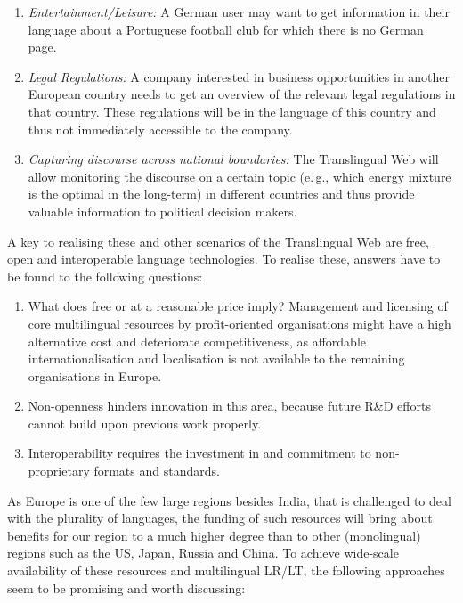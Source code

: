 \documentclass[10pt, plain]{../../metanetpaper}
\begin{document}
\begin{multicols}{2}
\begin{enumerate}
\item \emph{Entertainment/Leisure:} A German user may want to get information in their language about a Portuguese football club for which there is no German page.
\item \emph{Legal Regulations:} A company interested in business opportunities in another European country needs to get an overview of the relevant legal regulations in that country. These regulations will be in the language of this country and thus not immediately accessible to the company.
\item \emph{Capturing discourse across national boundaries:} The Translingual Web will allow monitoring the discourse on a certain topic (e.\,g., which energy mixture is the optimal in the long-term) in different countries and thus provide valuable information to political decision makers.
\end{enumerate}

A key to realising these and other scenarios of the Translingual Web are free, open and interoperable language technologies. To realise these, answers have to be found to the following questions:

\begin{enumerate}
\item What does free or at  a reasonable price imply? Management and licensing of core multilingual resources by profit-oriented organisations might have a high alternative cost and deteriorate competitiveness, as affordable internationalisation and localisation is not available to the remaining organisations in Europe.
\item Non-openness hinders innovation in this area, because future R\&D efforts cannot build upon previous work properly.
\item Interoperability requires the investment in and commitment to non-proprietary formats and standards.
\end{enumerate}

As Europe is one of the few large regions besides India, that is challenged to deal with the plurality of languages, the funding of such resources will bring about benefits for our region to a much higher degree than  to other (monolingual) regions such as the US, Japan, Russia and China.  To achieve wide-scale availability of these resources and multilingual LR/LT, the following approaches seem to be promising and worth discussing:


\end{multicols}
\end{document}

